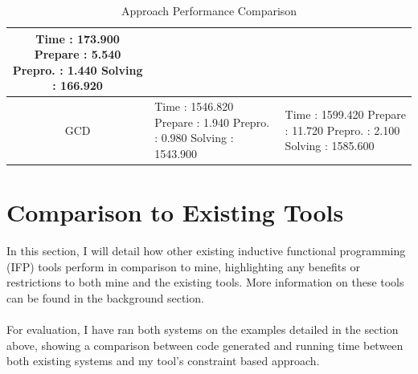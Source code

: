 \begin{table}[p!]
\begin{tabular}{|c|m{10em}|m{10em}|}
Time        : 173.900 \newline
  Prepare   : 5.540 \newline
  Prepro.   : 1.440 \newline
  Solving   : 166.920 \newline
\\
\hline
GCD 
& 
\mbox{}\newline 
Time        : 1546.820 \newline
  Prepare   : 1.940 \newline
  Prepro.   : 0.980 \newline
  Solving   : 1543.900 \newline
& 
\mbox{}\newline 
Time        : 1599.420 \newline
  Prepare   : 11.720 \newline
  Prepro.   : 2.100 \newline
  Solving   : 1585.600 \newline
\\
\hline
\end{tabular}
\caption{Approach Performance Comparison }
\label{table:3}
\end{table}

\pagebreak
\section{Comparison to Existing Tools}

In this section, I will detail how other existing inductive functional programming (IFP) tools perform in comparison to mine, highlighting any benefits or restrictions to both mine and the existing tools. More information on these tools can be found in the background section. \\ \\
For evaluation, I have ran both systems on the examples detailed in the section above, showing a comparison between code generated and running time between both existing systems and my tool's constraint based approach.

